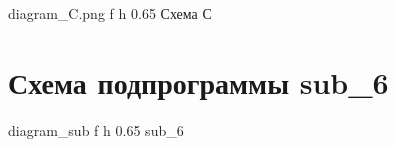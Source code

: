 \documentclass[a4paper,12pt]{bmstu}
\begin{document}
{diagram_C.png} %
{f} %
{h} %
{0.65\textwidth} %
{Схема С} %
\clearpage

\section{Схема подпрограммы sub\_6}\label{sec:sub}
{diagram_sub} %
{f} %
{h} %
{0.65\textwidth} %
{sub\_6} %
\end{document}

